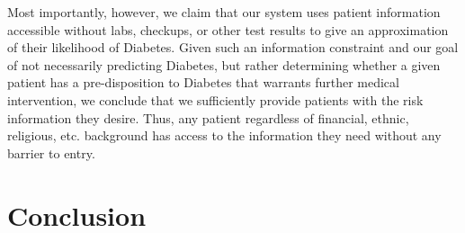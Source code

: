 \documentclass[conference]{IEEEtran}
\begin{document}
    Most importantly, however, we claim that our system uses patient information accessible without labs, checkups, or other test results to give an approximation of their likelihood of Diabetes. Given such an information constraint and our goal of not necessarily predicting Diabetes, but rather determining whether a given patient has a pre-disposition to Diabetes that warrants further medical intervention, we conclude that we sufficiently provide patients with the risk information they desire. Thus, any patient regardless of financial, ethnic, religious, etc. background has access to the information they need without any barrier to entry.

    

\section{Conclusion}\label{sec:conclusion}
\end{document}

